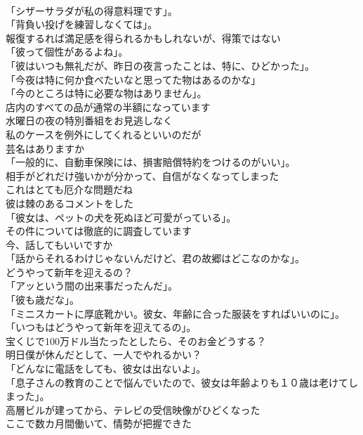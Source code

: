 \documentclass[8pt]{extreport}
\begin{document}
\begin{CJK}{UTF8}{min}
\\	「シザーサラダが私の得意料理です」。	
\\	「背負い投げを練習しなくては」。	
\\	報復するれば満足感を得られるかもしれないが、得策ではない	
\\	「彼って個性があるよね」。	
\\	「彼はいつも無礼だが、昨日の夜言ったことは、特に、ひどかった」。	
\\	「今夜は特に何か食べたいなと思ってた物はあるのかな」	
\\	「今のところは特に必要な物はありません」。	
\\	店内のすべての品が通常の半額になっています	
\\	水曜日の夜の特別番組をお見逃しなく	
\\	私のケースを例外にしてくれるといいのだが	
\\	芸名はありますか	
\\	「一般的に、自動車保険には、損害賠償特約をつけるのがいい」。	
\\	相手がどれだけ強いかが分かって、自信がなくなってしまった	
\\	これはとても厄介な問題だね	
\\	彼は棘のあるコメントをした	
\\	「彼女は、ペットの犬を死ぬほど可愛がっている」。	
\\	その件については徹底的に調査しています	
\\	今、話してもいいですか	
\\	「話からそれるわけじゃないんだけど、君の故郷はどこなのかな」。	
\\	どうやって新年を迎えるの？	
\\	「アッという間の出来事だったんだ」。	
\\	「彼も歳だな」。	
\\	「ミニスカートに厚底靴かい。彼女、年齢に合った服装をすればいいのに」。	
\\	「いつもはどうやって新年を迎えてるの」。	
\\	宝くじで100万ドル当たったとしたら、そのお金どうする？	
\\	明日僕が休んだとして、一人でやれるかい？	
\\	「どんなに電話をしても、彼女は出ないよ」。	
\\	「息子さんの教育のことで悩んでいたので、彼女は年齢よりも１０歳は老けてしまった」。	
\\	高層ビルが建ってから、テレビの受信映像がひどくなった	
\\	ここで数カ月間働いて、情勢が把握できた	

\end{CJK}
\end{document}
